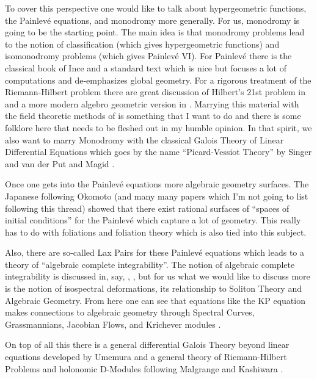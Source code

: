 \documentclass[12pt]{book}
\numberwithin{equation}{section}
\theoremstyle{definition}
\theoremstyle{remark}
\begin{document}
To cover this perspective one would like to talk about hypergeometric functions, the Painlev\'{e} equations, and monodromy more generally. 
For us, monodromy is going to be the starting point.
The main idea is that monodromy problems lead to the notion of classification (which gives hypergeometric functions) and isomonodromy problems (which gives Painlev\'e VI). 
For Painlev\'e there is the classical book of Ince \cite{Ince1944} and a standard text \cite{Iwasaki1991} which is nice but focuses a lot of computations and de-emphasizes global geometry.
For a rigorous treatment of the Riemann-Hilbert problem there are great discussion of Hilbert's 21st problem in \cite{Borel1987} and a more modern algebro geometric version in \cite{Deligne1970}.
Marrying this material with the field theoretic methods of \cite{Buium1986} is something that I want to do and there is some folklore here that needs to be fleshed out in my humble opinion.
In that spirit, we also want to marry Monodromy with the classical Galois Theory of Linear Differential Equations which goes by the name ``Picard-Vessiot Theory'' by Singer and van der Put \cite{Put2003} and Magid \cite{Magid1994}.


Once one gets into the Painlev\'{e} equations more algebraic geometry surfaces. The Japanese following  Okomoto \cite{Okamoto1987b,Okamoto1987,Okamoto1986, Okamoto1987a} (and many many papers which I'm not going to list following this thread) showed that there exist rational surfaces of ``spaces of initial conditions'' for the Painlev\'{e} which capture a lot of geometry. 
This really has to do with foliations and foliation theory which is also tied into this subject. 

Also, there are so-called Lax Pairs for these Painlev\'{e} equations which leads to a theory of ``algebraic complete integrability''. 
The notion of algebraic complete integrability is discussed in, say, \cite{Beauville1990}, \cite{Adler2004}, but for us what we would like to discuss more is the notion of isospectral deformations, its relationship to Soliton Theory and Algebraic Geometry.
From here one can see that equations like the KP equation makes connections to algebraic geometry through Spectral Curves, Grassmannians, Jacobian Flows, and Krichever modules \cite{Mulase1994} \cite{Segal1998} \cite{Sato1983} \cite{Miwa2000}.

On top of all this there is a general differential Galois Theory beyond linear equations  developed by Umemura \cite{Umemura2011} and a general theory of Riemann-Hilbert  Problems and holonomic D-Modules following Malgrange and Kashiwara \cite{Borel1987}.
\end{document}
